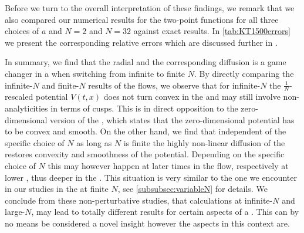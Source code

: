 Before we turn to the overall interpretation of these findings, we remark that we also compared our numerical results for the \ipi{} two-point functions for all three choices of $a$ and $N = 2$ and $N = 32$ against exact results.
In \cref{tab:KT1500errors} we present the corresponding relative errors which are discussed further in \LargeNnumApp.\bigskip

In summary, we find that the radial \sigmaMode{} and the corresponding diffusion is a game changer in a \qft{} when switching from infinite to finite $N$. 
By directly comparing the infinite-$N$ and finite-$N$ results of the \frg{} flows, we observe that for infinite-$N$ the $\tfrac{1}{N}$-rescaled potential $V ( t, x )$ does not turn convex in the \ir{} and may still involve non-analyticities in terms of cusps.
This is in direct opposition to the zero-dimensional version of the \cmwhTheoremWithRefs{}, which states that the zero-dimensional \ir{} potential has to be convex and smooth.
On the other hand, we find that independent of the specific choice of $N$ \dash{} as long as $N$ is finite \dash{} the highly non-linear diffusion of the \sigmaMode{} restores convexity and smoothness of the \ir{} potential.
Depending on the specific choice of $N$ this may however happen at later times in the \frg{} flow, respectively at lower \rgscales{}, thus deeper in the \ir{}.
This situation is very similar to the one we encounter in our studies in the \gnym{} at finite $N$, see \cref{subsubsec:variableN} for details.
We conclude from these non-perturbative \frg{} studies, that calculations at infinite-$N$ and large-$N$, may lead to totally different results for certain aspects of a \qft{}.
This can by no means be considered a novel insight \dash{} however the \frg{} \cfd{} aspects in this context are.

	
